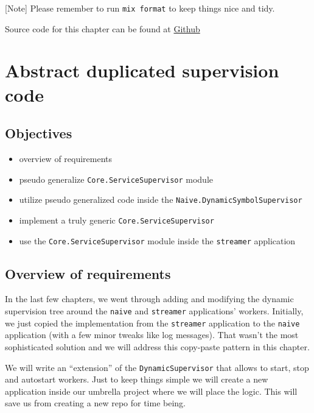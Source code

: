 \documentclass[
]{book}
\providecommand{\tightlist}{%
  \setlength{\itemsep}{0pt}\setlength{\parskip}{0pt}}
\begin{document}
{[}Note{]} Please remember to run \texttt{mix\ format} to keep things nice and tidy.

Source code for this chapter can be found at \href{https://github.com/frathon/create-a-cryptocurrency-trading-bot-in-elixir-source-code/tree/chapter_12}{Github}

\hypertarget{abstract-duplicated-supervision-code}{%
\chapter{Abstract duplicated supervision code}\label{abstract-duplicated-supervision-code}}

\hypertarget{objectives-12}{%
\section{Objectives}\label{objectives-12}}

\begin{itemize}
\tightlist
\item
  overview of requirements
\item
  pseudo generalize \texttt{Core.ServiceSupervisor} module
\item
  utilize pseudo generalized code inside the \texttt{Naive.DynamicSymbolSupervisor}
\item
  implement a truly generic \texttt{Core.ServiceSupervisor}
\item
  use the \texttt{Core.ServiceSupervisor} module inside the \texttt{streamer} application
\end{itemize}

\hypertarget{overview-of-requirements}{%
\section{Overview of requirements}\label{overview-of-requirements}}

In the last few chapters, we went through adding and modifying the dynamic supervision tree around the \texttt{naive} and \texttt{streamer} applications' workers. Initially, we just copied the implementation from the \texttt{streamer} application to the \texttt{naive} application (with a few minor tweaks like log messages). That wasn't the most sophisticated solution and we will address this copy-paste pattern in this chapter.

We will write an ``extension'' of the \texttt{DynamicSupervisor} that allows to start, stop and autostart workers. Just to keep things simple we will create a new application inside our umbrella project where we will place the logic. This will save us from creating a new repo for time being.
\end{document}
